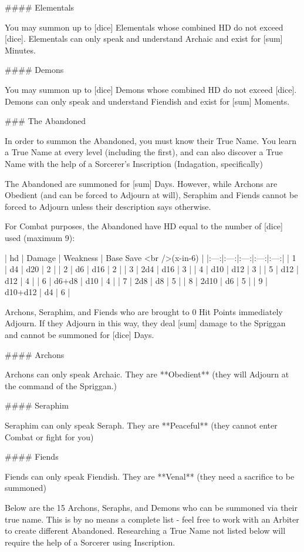 #### Elementals

You may summon up to [dice] Elementals whose combined HD do not exceed [dice]. Elementals can only speak and understand Archaic and exist for [sum] Minutes. 



#### Demons

You may summon up to [dice] Demons whose combined HD do not exceed [dice].  Demons can only speak and understand Fiendish and exist for [sum] Moments.






### The Abandoned

In order to summon the Abandoned, you must know their True Name.  You learn a True Name at every level (including the first), and can also discover a True Name with the help of a Sorcerer's Inscription (Indagation, specifically)

The Abandoned are summoned for [sum] Days.  However, while Archons are Obedient (and can be forced to Adjourn at will), Seraphim and Fiends cannot be forced to Adjourn unless their description says otherwise.

For Combat purposes, the Abandoned have HD equal to the number of [dice] used (maximum 9):

| {hd} | Damage |  Weakness | Base Save <br />(x-in-6) | 
|:---:|:---:|:---:|:---:|:---:|
| 1 | d4 |  d20 | 2 |
| 2 | d6 |  d16 | 2 |
| 3 | 2d4 |  d16 | 3 |
| 4 | d10 |  d12 | 3 |
| 5 | d12 |  d12 | 4 |
| 6 | d6+d8 |  d10 | 4 |
| 7 | 2d8 |  d8 | 5 |
| 8 | 2d10 |  d6 | 5 |
| 9 | d10+d12 |  d4 | 6 |

Archons, Seraphim, and Fiends who are brought to 0 Hit Points immediately Adjourn.  If they Adjourn in this way, they deal [sum] damage to the Spriggan and cannot be summoned for [dice] Days.

#### Archons

Archons can only speak Archaic.  They are **Obedient** (they will Adjourn at the command of the Spriggan.)

#### Seraphim

Seraphim can only speak Seraph.  They are **Peaceful** (they cannot enter Combat or fight for you)

#### Fiends

Fiends can only speak Fiendish.  They are **Venal** (they need a sacrifice to be summoned)

Below are the 15 Archons, Seraphs, and Demons who can be summoned via their true name.  This is by no means a complete list - feel free to work with an Arbiter to create different Abandoned.  Researching a True Name not listed below will require the help of a Sorcerer using Inscription.  






